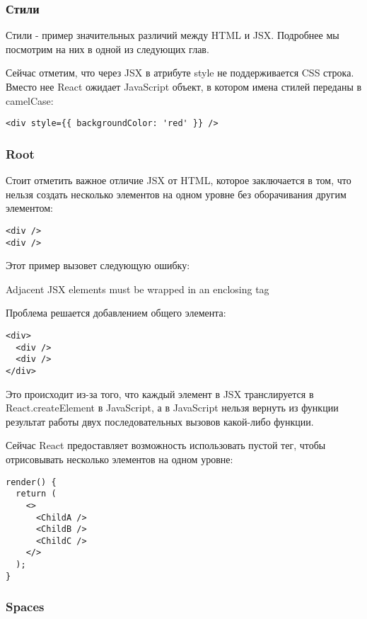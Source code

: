 \documentclass[12pt]{book}
\begin{document}
\subsubsection*{Стили}

Стили - пример значительных различий между HTML и JSX. Подробнее мы посмотрим на них в одной из следующих глав. 

Сейчас отметим, что через JSX в атрибуте style не поддерживается CSS строка. Вместо нее React ожидает JavaScript объект, в котором имена стилей переданы в camelCase:

\begin{lstlisting}
<div style={{ backgroundColor: 'red' }} />
\end{lstlisting}

\subsubsection*{Root}

Стоит отметить важное отличие JSX от HTML, которое заключается в том, что нельзя создать несколько элементов на одном уровне без оборачивания другим элементом:

\begin{lstlisting}
<div />
<div />
\end{lstlisting}

Этот пример вызовет следующую ошибку:

Adjacent JSX elements must be wrapped in an enclosing tag

Проблема решается добавлением общего элемента:

\begin{lstlisting}
<div> 
  <div />
  <div />
</div>
\end{lstlisting}
   
Это происходит из-за того, что каждый элемент в JSX транслируется в React.createElement в JavaScript, а в JavaScript нельзя вернуть из функции результат работы двух последовательных вызовов какой-либо функции.

Сейчас React предоставляет возможность использовать пустой тег, чтобы отрисовывать несколько элементов на одном уровне:

\begin{lstlisting}
render() {
  return (
    <>
      <ChildA />
      <ChildB />
      <ChildC />
    </>
  );
}
\end{lstlisting}
  
\subsubsection*{Spaces}   
\end{document}
